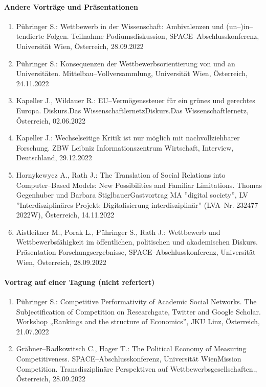 \paragraph{Andere Vorträge und Präsentationen}
\begin{enumerate}
	\item Pühringer S.: Wettbewerb in der Wissenschaft: Ambivalenzen und (un--)in--tendierte Folgen. Teilnahme Podiumsdiskussion, SPACE--Abschlusskonferenz, Universität Wien, Österreich, 28.09.2022
	\item Pühringer S.: Konsequenzen der Wettbewerbsorientierung von und an Universitäten. Mittelbau--Vollversammlung, Universität Wien, Österreich, 24.11.2022
	\item Kapeller J., Wildauer R.: EU--Vermögenssteuer für ein grünes und gerechtes Europa. Diskurs.Das WissenschaftlernetzDiskurs.Das Wissenschaftlernetz, Österreich, 02.06.2022
	\item Kapeller J.: Wechselseitige Kritik ist nur möglich mit nachvollziehbarer Forschung. ZBW Leibniz Informationszentrum Wirtschaft, Interview, Deutschland, 29.12.2022
	\item Hornykewycz A., Rath J.: The Translation of Social Relations into Computer--Based Models: New Possibilities and Familiar Limitations. Thomas Gegenhuber und Barbara StiglbauerGastvortrag MA ''digital society'', LV ''Interdisziplinäres Projekt: Digitalisierung interdisziplinär'' (LVA--Nr. 232477 2022W), Österreich, 14.11.2022
	\item Aistleitner M., Porak L., Pühringer S., Rath J.: Wettbewerb und Wettbewerbsfähigkeit im öffentlichen, politischen und akademischen Diskurs. Präsentation Forschungsergebnisse, SPACE--Abschlusskonferenz, Universität Wien, Österreich, 28.09.2022
\end{enumerate}
\paragraph{Vortrag auf einer Tagung (nicht referiert)}
\begin{enumerate}
	\item Pühringer S.: Competitive Performativity of Academic Social Networks. The Subjectification of Competition on Researchgate, Twitter and Google Scholar. Workshop „Rankings and the structure of Economics”, JKU Linz, Österreich, 21.07.2022
	\item Gräbner--Radkowitsch C., Hager T.: The Political Economy of Measuring Competitiveness. SPACE--Abschlusskonferenz, Universität WienMission Competition. Transdisziplinäre Perspektiven auf Wettbewerbsgesellschaften., Österreich, 28.09.2022
\end{enumerate}
